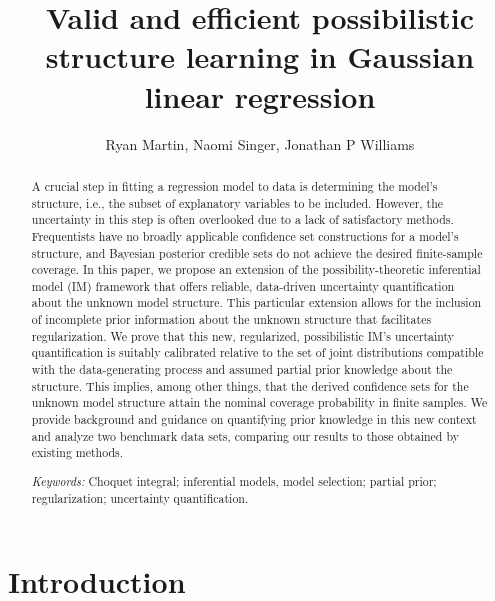 \documentclass[12pt]{article}
\title{Valid and efficient possibilistic structure learning in Gaussian linear regression}
\author{Ryan Martin, Naomi Singer, Jonathan P Williams}
\begin{document}
\maketitle

\begin{abstract}
A crucial step in fitting a regression model to data is determining the model's structure, i.e., the subset of explanatory variables to be included.  However, the uncertainty in this step is often overlooked due to a lack of satisfactory methods. Frequentists have no broadly applicable confidence set constructions for a model's structure, and Bayesian posterior credible sets do not achieve the desired finite-sample coverage. In this paper, we propose an extension of the possibility-theoretic inferential model (IM) framework that offers reliable, data-driven uncertainty quantification about the unknown model structure.  This particular extension allows for the inclusion of incomplete prior information about the unknown structure that facilitates regularization.  We prove that this new, regularized, possibilistic IM's uncertainty quantification is suitably calibrated relative to the set of joint distributions compatible with the data-generating process and assumed partial prior knowledge about the structure.  This implies, among other things, that the derived confidence sets for the unknown model structure attain the nominal coverage probability in finite samples. We provide background and guidance on quantifying prior knowledge in this new context and analyze two benchmark data sets, comparing our results to those obtained by existing methods. 

\smallskip

{\it Keywords:} Choquet integral; inferential models, model selection; partial prior; regularization; uncertainty quantification.
\end{abstract}





\section{Introduction} 
\label{sec:intro}
\end{document}
